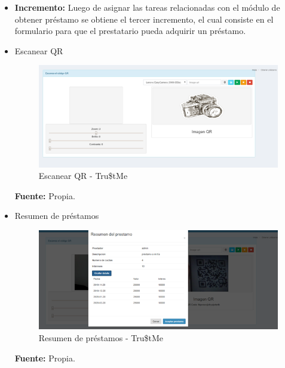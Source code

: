 {{			\begin{itemize}
				
				\item \textbf{Incremento:} Luego de asignar las tareas relacionadas con el módulo de obtener préstamo se obtiene el tercer incremento, el cual consiste en el formulario para que el prestatario pueda adquirir un préstamo.
				
				
				\item Escanear QR
				\begin{figure}[H]
					\centering
					\includegraphics[width=1\linewidth]{development/escanearqr.png}
					\caption{Escanear QR - Tru\$tMe}
				\end{figure}
				\begin{center}
					\textbf{Fuente:} Propia.
				\end{center}
					
				\item Resumen de préstamos
				\begin{figure}[H]
					\centering
					\includegraphics[width=1\linewidth]{development/resumenprestamos.png}
					\caption{Resumen de préstamos - Tru\$tMe}
				\end{figure}
				\begin{center}
					\textbf{Fuente:} Propia.
				\end{center}
	
				
			\end{itemize}
			
			
			
		}

}
	


